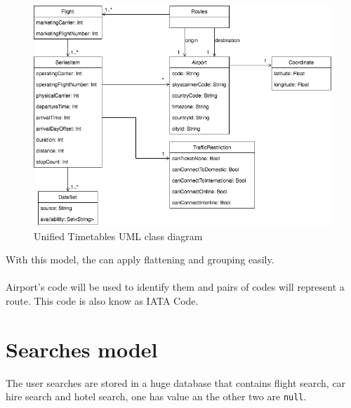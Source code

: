 \begin{figure}[H]
\centering
\includegraphics[scale=0.6]{diagrams/unified_model.png}
\caption{Unified Timetables UML class diagram}
\label{unified-uml}
\end{figure}

With this model, the  can apply flattening and grouping easily.
\\\\
Airport's code will be used to identify them and pairs of codes will represent a route. This code is also know as IATA Code\cite{iata_code}.


\section{Searches model}

The user searches are stored in a huge database that contains flight search, car hire search and hotel search, one has value an the other two are \texttt{null}.

